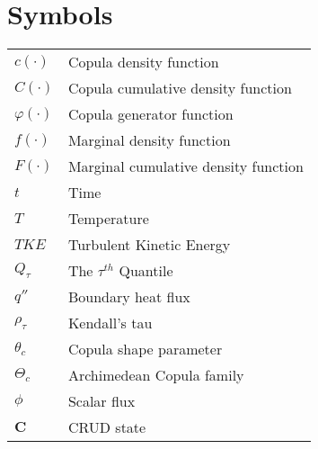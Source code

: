 \section*{Symbols}
\begin{tabular}{l l}
$c(\cdot)$ & Copula density function \\
$C(\cdot)$ & Copula cumulative density function \\
$\varphi(\cdot)$ & Copula generator function \\
$f(\cdot)$ & Marginal density function \\
$F(\cdot)$ & Marginal cumulative density function \\
$t$ & Time \\
$T$ & Temperature \\
$TKE$ & Turbulent Kinetic Energy \\
$Q_{\tau}$ & The $\tau^{th}$ Quantile \\
$q''$ & Boundary heat flux \\
$\rho_{\tau}$ & Kendall's tau \\
$\theta_c$ & Copula shape parameter \\
$\Theta_c$ & Archimedean Copula family \\
$\phi$ & Scalar flux \\
$\mathbf C$ & CRUD state \\
\end{tabular}

\pagebreak
